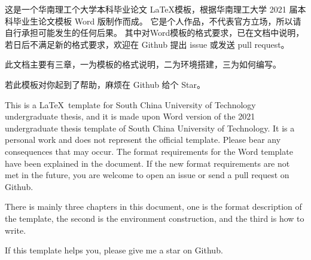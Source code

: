 \begin{cabstract}
    这是一个华南理工个大学本科毕业论文 \LaTeX 模板，根据华南理工大学 2021 届本科毕业生论文模板 Word 版制作而成。
    它是个人作品，不代表官方立场，所以请自行承担可能发生的任何后果。
    其中对Word模板的格式要求，已在文档中说明，若日后不满足新的格式要求，欢迎在 Github 提出 issue 或发送 pull request。

    此文档主要有三章，一为模板的格式说明，二为环境搭建，三为如何编写。

    若此模板对你起到了帮助，麻烦在 Github 给个 Star。
\end{cabstract}

\begin{eabstract}
    This is a \LaTeX~template for South China University of Technology undergraduate thesis, and it is made upon Word version of the 2021 undergraduate thesis template of South China University of Technology.
    It is a personal work and does not represent the official template.
    Please bear any consequences that may occur.
    The format requirements for the Word template have been explained in the document.
    If the new format requirements are not met in the future, you are welcome to open an issue or send a pull request on Github.

    There is mainly three chapters in this document, one is the format description of the template, the second is the environment construction, and the third is how to write.

     If this template helps you, please give me a star on Github.
\end{eabstract}